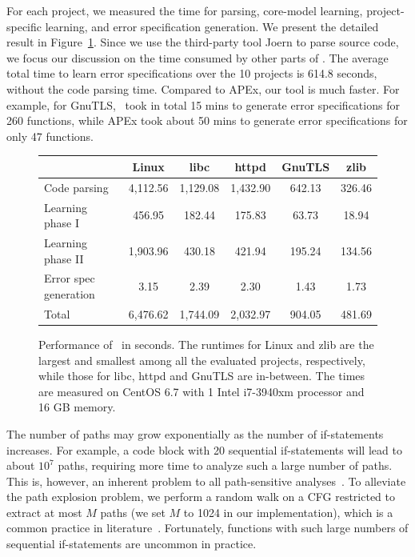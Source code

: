 \documentclass[12pt]{report}	%
\begin{document}
For each project, we measured the time for 
parsing, core-model learning, project-specific learning, 
and error specification generation.
We present the detailed result in Figure~\ref{fig:evalhperformance}.
Since we use the third-party tool Joern to parse source code, we 
focus our discussion on the time consumed by other parts of \newTool.
%
The average total time to learn error specifications over the 10 
projects is 614.8 seconds,
without the code parsing time.
Compared to APEx,
our tool is much faster.
For example, for GnuTLS, \newTool\ took in total 15 mins to generate 
error specifications for 260 functions,
while APEx took about 50 mins to generate error specifications 
for only 47 functions. 


\begin{figure}[t]
\centering
\begin{tabular}{l | c | c| c| c | c }
\toprule
& Linux & libc & httpd & GnuTLS & zlib \\
\midrule
Code parsing & 4,112.56 & 1,129.08 & 1,432.90 & 642.13 & 326.46 \\
Learning phase I & 456.95 & 182.44 & 175.83 & 63.73 & 18.94 \\
Learning phase II & 1,903.96 & 430.18 & 421.94 & 195.24 & 134.56 \\
Error spec generation & 3.15 & 2.39 & 2.30 & 1.43 & 1.73 \\
\midrule
Total & 6,476.62 & 1,744.09 & 2,032.97 & 904.05 & 481.69 \\
\bottomrule
\end{tabular}
\caption[Performance of \newTool]{Performance of \newTool\ in seconds.
The runtimes for Linux and zlib are the largest and smallest among all the evaluated projects, respectively,
while those for libc, httpd and GnuTLS are in-between.
The times are measured on CentOS 6.7 with 1 Intel i7-3940xm processor and 16 GB memory.}
\label{fig:evalhperformance}
\end{figure}

The number of paths may grow exponentially as 
the number of if-statements increases.
For example, 
a code block with 20 sequential if-statements
will lead to about $10^7$ paths,
requiring more time to analyze such a large number of paths.
%
This is, however, an inherent problem to all path-sensitive analyses~\cite{Dillig:2008:SCS:1375581.1375615}.
%
To alleviate the path explosion problem,
we perform a random walk on a CFG restricted to extract at most $M$ paths
(we set $M$ to 1024 in our implementation),
which is a common practice in literature~\cite{defreez2018path}.
%
Fortunately, functions with such
large numbers of sequential if-statements are uncommon in practice.
\end{document}
